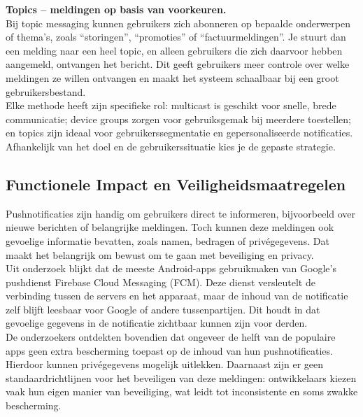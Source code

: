 \textbf{Topics – meldingen op basis van voorkeuren.}\\  
Bij topic messaging kunnen gebruikers zich abonneren op bepaalde onderwerpen of thema’s, zoals “storingen”, “promoties” of “factuurmeldingen”. Je stuurt dan een melding naar een heel topic, en alleen gebruikers die zich daarvoor hebben aangemeld, ontvangen het bericht. Dit geeft gebruikers meer controle over welke meldingen ze willen ontvangen en maakt het systeem schaalbaar bij een groot gebruikersbestand.\\

Elke methode heeft zijn specifieke rol: multicast is geschikt voor snelle, brede communicatie; device groups zorgen voor gebruiksgemak bij meerdere toestellen; en topics zijn ideaal voor gebruikerssegmentatie en gepersonaliseerde notificaties. Afhankelijk van het doel en de gebruikerssituatie kies je de gepaste strategie.


\subsection{Functionele Impact en Veiligheidsmaatregelen}

Pushnotificaties zijn handig om gebruikers direct te informeren, bijvoorbeeld over nieuwe berichten of belangrijke meldingen. Toch kunnen deze meldingen ook gevoelige informatie bevatten, zoals namen, bedragen of privégegevens. Dat maakt het belangrijk om bewust om te gaan met beveiliging en privacy.\\

Uit onderzoek blijkt dat de meeste Android-apps gebruikmaken van Google’s pushdienst Firebase Cloud Messaging (FCM)\autocite{Neteler2024}. Deze dienst versleutelt de verbinding tussen de servers en het apparaat, maar de inhoud van de notificatie zelf blijft leesbaar voor Google of andere tussenpartijen. Dit houdt in dat gevoelige gegevens in de notificatie zichtbaar kunnen zijn voor derden.\\

De onderzoekers ontdekten bovendien dat ongeveer de helft van de populaire apps geen extra bescherming toepast op de inhoud van hun pushnotificaties. Hierdoor kunnen privégegevens mogelijk uitlekken\autocite{Neteler2024}. Daarnaast zijn er geen standaardrichtlijnen voor het beveiligen van deze meldingen: ontwikkelaars kiezen vaak hun eigen manier van beveiliging, wat leidt tot inconsistente en soms zwakke bescherming\autocite{Neteler2024}.\\


